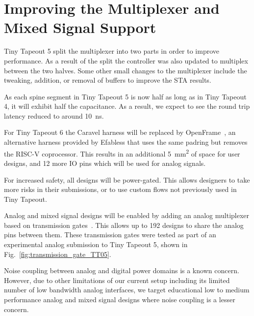 \section{Improving the Multiplexer and Mixed Signal Support}
\label{sec:improving}

Tiny Tapeout 5 split the multiplexer into two parts in order to improve performance. As a result of the split the controller was also updated to multiplex between the two halves.
Some other small changes to the multiplexer include the tweaking, addition, or removal of buffers to improve the STA results.

As each spine segment in Tiny Tapeout 5 is now half as long as in Tiny Tapeout 4, it will exhibit half the capacitance. As a result, we expect to see the round trip latency reduced to around \qty{10}{\ns}.

For Tiny Tapeout 6 the Caravel harness will be replaced by OpenFrame~\cite{openframe}, an alternative harness provided by Efabless that uses the same padring but removes the RISC-V coprocessor.
This results in an additional \qty{5}{\mm\squared} of space for user designs, and 12 more IO pins which will be used for analog signals.

For increased safety, all designs will be power-gated. This allows designers to take more risks in their submissions, or to use custom flows not previously used in Tiny Tapeout.

Analog and mixed signal designs will be enabled by adding an analog multiplexer based on transmission gates~\cite{transmissiongates}. 
This allows up to 192 designs to share the analog pins between them.
These transmission gates were tested as part of an experimental analog submission to Tiny Tapeout 5, shown in Fig.~\ref{fig:transmission_gate_TT05}.

Noise coupling between analog and digital power domains is a known concern. However, due to other limitations of our current setup including its limited number of low bandwidth analog interfaces, we target educational low to medium performance analog and mixed signal designs where noise coupling is a lesser concern.


